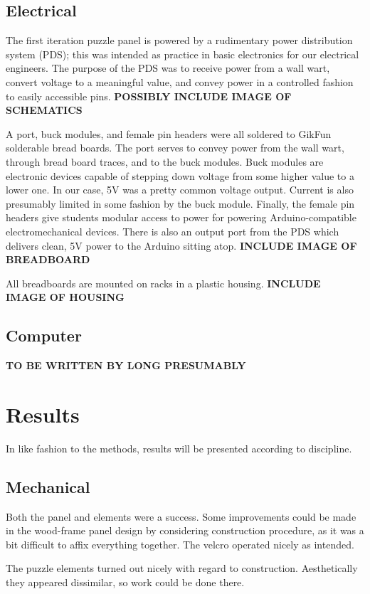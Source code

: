 \documentclass[conference]{IEEEtran}
\begin{document}
	\subsection{Electrical}
	The first iteration puzzle panel is powered by a rudimentary power distribution system (PDS); this was intended as practice in basic electronics for our electrical engineers. The purpose of the PDS was to receive power from a wall wart, convert voltage to a meaningful value, and convey power in a controlled fashion to easily accessible pins.
	\textbf{POSSIBLY INCLUDE IMAGE OF SCHEMATICS}
	
	A port, buck modules, and female pin headers were all soldered to GikFun solderable bread boards. The port serves to convey power from the wall wart, through bread board traces, and to the buck modules. Buck modules are electronic devices capable of stepping down voltage from some higher value to a lower one. In our case, 5V was a pretty common voltage output. Current is also presumably limited in some fashion by the buck module. Finally, the female pin headers give students modular access to power for powering Arduino-compatible electromechanical devices. There is also an output port from the PDS which delivers clean, 5V power to the Arduino sitting atop. 
	\textbf{INCLUDE IMAGE OF BREADBOARD}
	
	All breadboards are mounted on racks in a plastic housing.
	\textbf{INCLUDE IMAGE OF HOUSING}

	\subsection{Computer}
	\textbf{TO BE WRITTEN BY LONG PRESUMABLY}

\section{Results}
In like fashion to the methods, results will be presented according to discipline.
	\subsection{Mechanical}
	Both the panel and elements were a success. Some improvements could be made in the wood-frame panel design by considering construction procedure, as it was a bit difficult to affix everything together. The velcro operated nicely as intended.
	
	The puzzle elements turned out nicely with regard to construction. Aesthetically they appeared dissimilar, so work could be done there.
	
\end{document}
